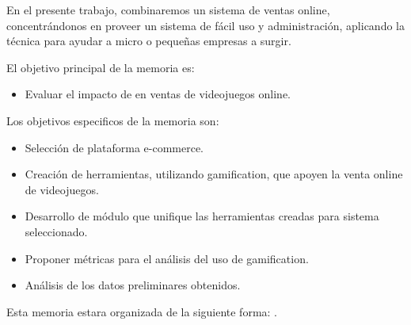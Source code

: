 En el presente trabajo, combinaremos un sistema de ventas online, concentrándonos
en proveer un sistema de fácil uso y administración, aplicando la técnica {\GAM}
para ayudar a micro o pequeñas empresas a surgir.

El objetivo principal de la memoria es:

\begin{itemize}
    \item Evaluar el impacto de {\GAM} en ventas de videojuegos online.
\end{itemize}

Los objetivos especificos de la memoria son:
\begin{itemize}
    \item Selección de plataforma e-commerce.
    \item Creación de herramientas, utilizando gamification, que apoyen la
          venta online de videojuegos.
    \item Desarrollo de módulo que unifique las herramientas creadas para sistema
          seleccionado.
    \item Proponer métricas para el análisis del uso de gamification.
    \item Análisis de los datos preliminares obtenidos.
\end{itemize}

Esta memoria estara organizada de la siguiente forma:
.

